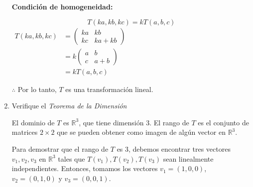 \begin{enumerate}
    \textbf{Condición de homogeneidad:}
    
    $$ T(ka,kb,kc)=kT(a,b,c) $$
    $
    \begin{aligned}
        T(ka,kb,kc) &= \left(
                                            \begin{array}{cc}
                                                ka & kb \\
                                                kc & ka+kb
                                            \end{array}
                                        \right) \\
        &= k \left(
                                            \begin{array}{cc}
                                                a & b \\
                                                c & a+b
                                            \end{array}
                                        \right) \\
        &= kT(a,b,c)
    \end{aligned}
    $
       
    $\therefore$ Por lo tanto, $T$ es una transformación lineal.

    \item Verifique el \textit{Teorema de la Dimensión}
    
    El dominio de $T$ es $\mathbb{R}^{3}$, que tiene dimensión 3.
    El rango de $T$ es el conjunto de matrices $2\times2$
    que se pueden obtener como imagen de algún vector en $\mathbb{R}^{3}$.

    Para demostrar que el rango de $T$ es 3, debemos encontrar
    tres vectores $v_{1},v_{2},v_{3}$ en $\mathbb{R}^{3}$ tales que
    $T(v_{1}),T(v_{2}),T(v_{3})$ sean linealmente independientes. Entonces, tomamos los vectores $v_{1} = (1,0,0)$, $v_{2} = (0,1,0)$ y $v_{3} = (0,0,1)$.
    

\end{enumerate}
